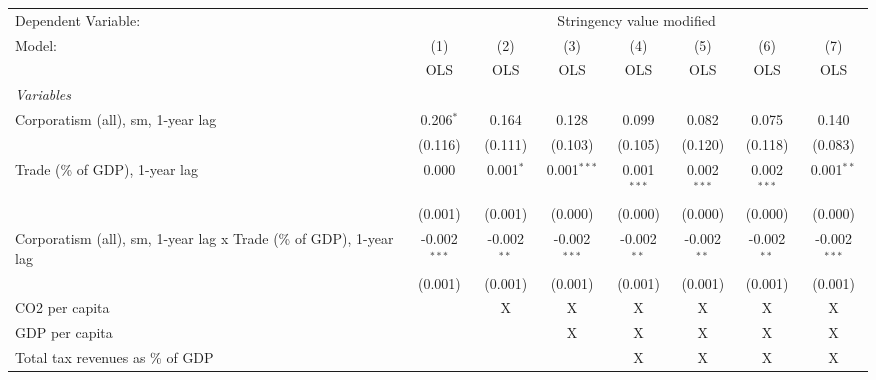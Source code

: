 
\begingroup
\centering
\begin{tabular}{lccccccc}
   \toprule
   Dependent Variable: & \multicolumn{7}{c}{Stringency value modified}\\
   Model:                                                             & (1)            & (2)           & (3)            & (4)           & (5)           & (6)           & (7)\\  
                                                                      &  OLS           & OLS           & OLS            & OLS           & OLS           & OLS           & OLS\\  
   \midrule
   \emph{Variables}\\
   Corporatism (all), sm, 1-year lag                                  & 0.206$^{*}$    & 0.164         & 0.128          & 0.099         & 0.082         & 0.075         & 0.140\\   
                                                                      & (0.116)        & (0.111)       & (0.103)        & (0.105)       & (0.120)       & (0.118)       & (0.083)\\   
   Trade (\% of GDP), 1-year lag                                      & 0.000          & 0.001$^{*}$   & 0.001$^{***}$  & 0.001$^{***}$ & 0.002$^{***}$ & 0.002$^{***}$ & 0.001$^{**}$\\   
                                                                      & (0.001)        & (0.001)       & (0.000)        & (0.000)       & (0.000)       & (0.000)       & (0.000)\\   
   Corporatism (all), sm, 1-year lag x Trade (\% of GDP), 1-year lag  & -0.002$^{***}$ & -0.002$^{**}$ & -0.002$^{***}$ & -0.002$^{**}$ & -0.002$^{**}$ & -0.002$^{**}$ & -0.002$^{***}$\\   
                                                                      & (0.001)        & (0.001)       & (0.001)        & (0.001)       & (0.001)       & (0.001)       & (0.001)\\   
   CO2 per capita                                                     &                & X             & X              & X             & X             & X             & X\\  
   GDP per capita                                                     &                &               & X              & X             & X             & X             & X\\  
   Total tax revenues as \% of GDP                                    &                &               &                & X             & X             & X             & X\\  

\end{tabular}
